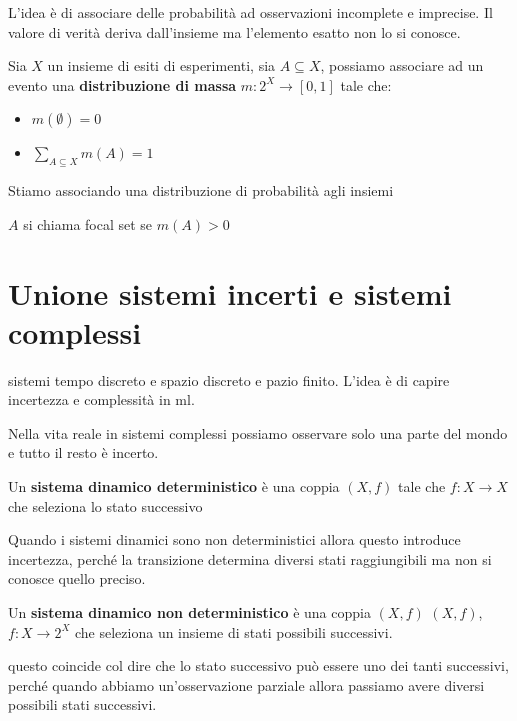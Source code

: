 L'idea è di associare delle probabilità ad osservazioni incomplete e imprecise.
Il valore di verità deriva dall'insieme ma l'elemento esatto non lo si conosce.

\begin{definizione}
    Sia $X$ un insieme di esiti di esperimenti, sia $A\subseteq X$, possiamo associare
    ad un evento una \textbf{distribuzione di massa} $m:2^X\to [0,1]$ tale che:
    \begin{itemize}
        \item $m(\emptyset) = 0$
        \item $\sum_{A\subseteq X}m(A) = 1$
    \end{itemize}
\end{definizione}
Stiamo associando una distribuzione di probabilità agli insiemi
\begin{definizione}
    $A$ si chiama focal set se $m(A)>0$ 
\end{definizione}



\section{Unione sistemi incerti e sistemi complessi}
sistemi tempo discreto e spazio discreto e pazio finito. L'idea è di capire incertezza 
e complessità in ml.

Nella vita reale in sistemi complessi possiamo osservare solo una parte del mondo 
e tutto il resto è incerto.

\begin{definizione}
    Un \textbf{sistema dinamico deterministico} è una coppia $(X,f)$ tale che 
    $f:X\to X$  che seleziona lo stato successivo
\end{definizione}

Quando i sistemi dinamici sono non deterministici allora questo introduce incertezza,
perché la transizione determina diversi stati raggiungibili ma non si conosce
quello preciso.

\begin{definizione}
    Un \textbf{sistema dinamico non deterministico} è una coppia $(X,f)$
    $(X,f)$, $f:X\to 2^X$  che seleziona un insieme di stati possibili successivi.
\end{definizione}

questo coincide col dire che lo stato successivo può essere uno dei tanti successivi,
perché quando abbiamo un'osservazione parziale allora passiamo avere diversi possibili 
stati successivi.

